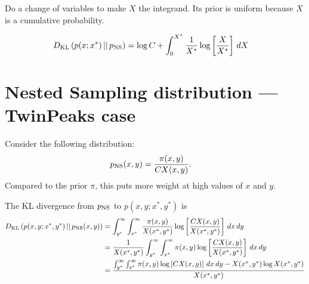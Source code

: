 \documentclass[a4paper, 12pt]{article}
\begin{document}
Do a change of variables to make $X$ the integrand. Its prior is uniform
because $X$ is a cumulative probability.

\begin{align}
D_{\rm KL}\left(p(x; x^*) \,||\, p_{\rm NS}\right)
    &= \log C + \int_{0}^{X^*} \frac{1}{X^*}
            \log \left[\frac{X}{X^*}\right] \, dX
\end{align}


\section{Nested Sampling distribution --- TwinPeaks case}

Consider the following distribution:
\begin{align}
p_{\rm NS}(x, y) &= \frac{\pi(x, y)}{C X(x, y)}.
\end{align}
Compared to the prior $\pi$, this puts more weight at high values of
$x$ and $y$.

The KL divergence from $p_{\rm NS}$ to $p(x, y ; x^*, y^*)$ is
\begin{align}
D_{\rm KL}\left(p(x, y; x^*, y^*) \,||\, p_{\rm NS}(x, y)\right)
&=
\int_{y^*}^{\infty} \int_{x^*}^{\infty}
    \frac{\pi(x, y)}{X(x^*, y^*)}
    \log \left[\frac{C X(x, y)}{X(x^*, y^*)}\right]
    \, dx \, dy \\
&=
\frac{1}{X(x^*, y^*)}
\int_{y^*}^{\infty} \int_{x^*}^{\infty}
    \pi(x, y)
    \log \left[\frac{C X(x, y)}{X(x^*, y^*)}\right]
    \, dx \, dy \\
&=
\frac{\int_{y^*}^{\infty} \int_{x^*}^{\infty}
     \pi(x, y)
     \log \left[C X(x, y)\right]
     \, dx \, dy - X(x^*, y^*)\log X(x^*, y^*)}
     {X(x^*, y^*)}
\end{align}
\end{document}
